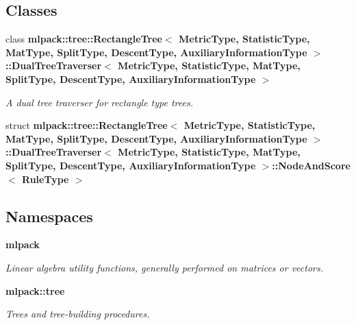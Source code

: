 \subsection*{Classes}
\begin{DoxyCompactItemize}
\item 
class {\bf mlpack\+::tree\+::\+Rectangle\+Tree$<$ Metric\+Type, Statistic\+Type, Mat\+Type, Split\+Type, Descent\+Type, Auxiliary\+Information\+Type $>$\+::\+Dual\+Tree\+Traverser$<$ Metric\+Type, Statistic\+Type, Mat\+Type, Split\+Type, Descent\+Type, Auxiliary\+Information\+Type $>$}
\begin{DoxyCompactList}\small\item\em A dual tree traverser for rectangle type trees. \end{DoxyCompactList}\item 
struct {\bf mlpack\+::tree\+::\+Rectangle\+Tree$<$ Metric\+Type, Statistic\+Type, Mat\+Type, Split\+Type, Descent\+Type, Auxiliary\+Information\+Type $>$\+::\+Dual\+Tree\+Traverser$<$ Metric\+Type, Statistic\+Type, Mat\+Type, Split\+Type, Descent\+Type, Auxiliary\+Information\+Type $>$\+::\+Node\+And\+Score$<$ Rule\+Type $>$}
\end{DoxyCompactItemize}
\subsection*{Namespaces}
\begin{DoxyCompactItemize}
\item 
 {\bf mlpack}
\begin{DoxyCompactList}\small\item\em Linear algebra utility functions, generally performed on matrices or vectors. \end{DoxyCompactList}\item 
 {\bf mlpack\+::tree}
\begin{DoxyCompactList}\small\item\em Trees and tree-\/building procedures. \end{DoxyCompactList}\end{DoxyCompactItemize}
